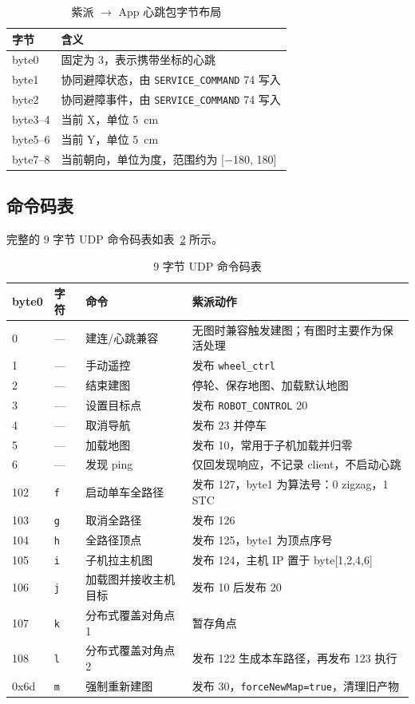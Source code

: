 \begin{table}[htbp]
\centering
\caption{紫派 $\to$ App 心跳包字节布局}
\label{tab:purplepi-to-app}
\begin{tabular}{ll}
\toprule
\textbf{字节} & \textbf{含义} \\
\midrule
byte0 & 固定为 3，表示携带坐标的心跳 \\
byte1 & 协同避障状态，由 \texttt{SERVICE\_COMMAND} 74 写入 \\
byte2 & 协同避障事件，由 \texttt{SERVICE\_COMMAND} 74 写入 \\
byte3--4 & 当前 X，单位 5~cm \\
byte5--6 & 当前 Y，单位 5~cm \\
byte7--8 & 当前朝向，单位为度，范围约为 [$-$180, 180] \\
\bottomrule
\end{tabular}
\end{table}

\subsection{命令码表}
\label{sec:command-table}

完整的 9 字节 UDP 命令码表如表~\ref{tab:command-codes} 所示。

\begin{table}[htbp]
\centering
\caption{9 字节 UDP 命令码表}
\label{tab:command-codes}
\small
\begin{tabularx}{\textwidth}{p{1.5cm}p{1.5cm}p{2.5cm}X}
\toprule
\textbf{byte0} & \textbf{字符} & \textbf{命令} & \textbf{紫派动作} \\
\midrule
0 & --- & 建连/心跳兼容 & 无图时兼容触发建图；有图时主要作为保活处理 \\
1 & --- & 手动遥控 & 发布 \texttt{wheel\_ctrl} \\
2 & --- & 结束建图 & 停轮、保存地图、加载默认地图 \\
3 & --- & 设置目标点 & 发布 \texttt{ROBOT\_CONTROL} 20 \\
4 & --- & 取消导航 & 发布 23 并停车 \\
5 & --- & 加载地图 & 发布 10，常用于子机加载并归零 \\
6 & --- & 发现 ping & 仅回发现响应，不记录 client，不启动心跳 \\
102 & \texttt{f} & 启动单车全路径 & 发布 127，byte1 为算法号：0 zigzag，1 STC \\
103 & \texttt{g} & 取消全路径 & 发布 126 \\
104 & \texttt{h} & 全路径顶点 & 发布 125，byte1 为顶点序号 \\
105 & \texttt{i} & 子机拉主机图 & 发布 124，主机 IP 置于 byte[1,2,4,6] \\
106 & \texttt{j} & 加载图并接收主机目标 & 发布 10 后发布 20 \\
107 & \texttt{k} & 分布式覆盖对角点 1 & 暂存角点 \\
108 & \texttt{l} & 分布式覆盖对角点 2 & 发布 122 生成本车路径，再发布 123 执行 \\
0x6d & \texttt{m} & 强制重新建图 & 发布 30，\texttt{forceNewMap=true}，清理旧产物 \\
\bottomrule
\end{tabularx}
\end{table}

